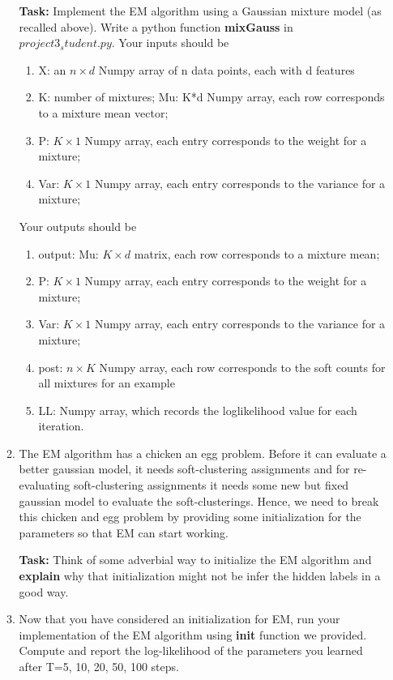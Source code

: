 \begin{enumerate}
\begin{enumerate}
    \textbf{Task:} Implement the EM algorithm using a Gaussian mixture model (as recalled above). Write a python function \textbf{mixGauss} in \texttt{$project3_student.py$}. Your inputs should be
    \begin{enumerate}
    \item X: an $n \times d$ Numpy array of n data points, each with d features
    \item K: number of mixtures; Mu: K*d Numpy array, each row corresponds to a mixture mean vector;
    \item P: $K \times 1$ Numpy array, each entry corresponds to the weight for a mixture;
    \item Var: $K \times 1$ Numpy array, each entry corresponds to the variance for a mixture;
    \end{enumerate}
    Your outputs should be
    \begin{enumerate}
    \item output: Mu: $K \times d$ matrix, each row corresponds to a mixture mean;
    \item P: $K \times 1$ Numpy array, each entry corresponds to the weight for a mixture;
    \item Var: $K \times 1$ Numpy array, each entry corresponds to the variance for a mixture;
    \item post: $n \times K$ Numpy array, each row corresponds to the soft counts for all mixtures for an example
    \item LL: Numpy array, which records the loglikelihood value for each iteration.
    \end{enumerate}

\item The EM algorithm has a chicken an egg problem. Before it can evaluate a better gaussian model, it needs soft-clustering assignments and for re-evaluating soft-clustering assignments it needs some new but fixed gaussian model to evaluate the soft-clusterings. Hence, we need to break this chicken and egg problem by providing some initialization for the parameters so that EM can start working.

	\textbf{Task:} Think of some adverbial way to initialize the EM algorithm and \textbf{explain} why that initialization might not be infer the hidden labels in a good way.

\item Now that you have considered an initialization for EM, run your implementation of the EM algorithm using \textbf{init} function we provided. Compute and report the log-likelihood of the parameters you learned after T=5, 10, 20, 50, 100 steps.


\end{enumerate}
\end{enumerate}
